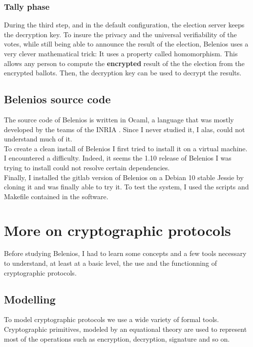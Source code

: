 \documentclass[12pt, a4paper]{report}
\begin{document}
\subsubsection{Tally phase}

During the third step, and in the default configuration, the election server keeps the decryption key. To insure the privacy and the universal verifiability of the votes, while still being able to announce the result of the election, Belenios uses a very clever mathematical trick: It uses a property called homomorphism. This allows any person to compute the \textbf{encrypted} result of the the election from the encrypted ballots. Then, the decryption key can be used to decrypt the results.
 
\subsection{Belenios source code}

The source code of Belenios is written in Ocaml, a language that was mostly developed by the teams of the INRIA . Since I never studied it, I alas, could not understand much of it.\\ 

To create a clean install of Belenios I first tried to install it on a virtual machine. I encountered a difficulty. Indeed, it seems the 1.10 release of Belenios I was trying to install could not resolve certain dependencies.\\

Finally, I installed the gitlab version of Belenios on a Debian 10 stable Jessie by cloning it and was finally able to try it. To test the system, I used the scripts and Makefile contained in the software.



\section{More on cryptographic protocols}

Before studying Belenios, I had to learn some concepts and a few tools necessary to understand, at least at a basic level, the use and the functionning of cryptographic protocols. 

\subsection{Modelling}

To model cryptographic protocols we use a wide variety of formal tools.
Cryptographic primitives, modeled by an equational theory are used to represent most of the operations such as encryption, decryption, signature and so on.
\end{document}
